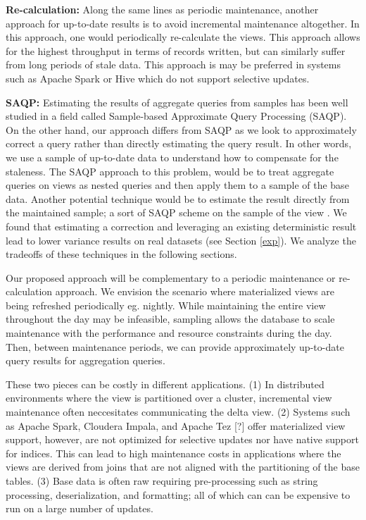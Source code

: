 \noindent\textbf{Re-calculation: }
Along the same lines as periodic maintenance, another approach 
for up-to-date results is to avoid incremental maintenance altogether.
In this approach, one would periodically re-calculate the views.
This approach allows for the highest throughput in terms of records written, but can
similarly suffer from long periods of stale data.
This approach is may be preferred in systems such as Apache Spark or Hive which do not support
selective updates. 

\vspace{1em}

\noindent\textbf{SAQP: }
Estimating the results of aggregate queries from samples has been
well studied in a field called Sample-based Approximate Query Processing
(SAQP). On the other hand, our approach differs from SAQP as we look to
approximately correct a query rather than directly estimating the query result.
In other words, we use a sample of up-to-date data to understand how to compensate for the
staleness. The SAQP approach to this problem, would be to treat aggregate
queries on views as nested queries and then apply them to a sample
of the base data. Another potential technique would be to
estimate the result directly from the maintained sample; a sort of
SAQP scheme on the sample of the view \cite{joshi2008materialized}. We found that estimating
a correction and leveraging an existing deterministic result lead
to lower variance results on real datasets (see Section \ref{exp}). We analyze
the tradeoffs of these techniques in the following sections.

\vspace{1em}

Our proposed approach will be complementary to a periodic maintenance or re-calculation approach.
We envision the scenario where materialized views are being refreshed periodically eg. nightly.
While maintaining the entire view throughout the day may be infeasible, sampling allows the database to scale maintenance with the performance and resource constraints during the day.
Then, between maintenance periods, we can provide approximately up-to-date query results for aggregation queries.









\iffalse
 These two pieces can be costly in different
applications. (1) In distributed environments where the view is partitioned
over a cluster, incremental view maintenance often neccesitates communicating
the delta view. (2) Systems such as Apache Spark, Cloudera Impala,
and Apache Tez {[}?{]} offer materialized view support, however, are
not optimized for selective updates nor have native support for indices.
This can lead to high maintenance costs in applications where the
views are derived from joins that are not aligned with the partitioning
of the base tables. (3) Base data is often raw requiring pre-processing
such as string processing, deserialization, and formatting; all of
which can can be expensive to run on a large number of updates. 



